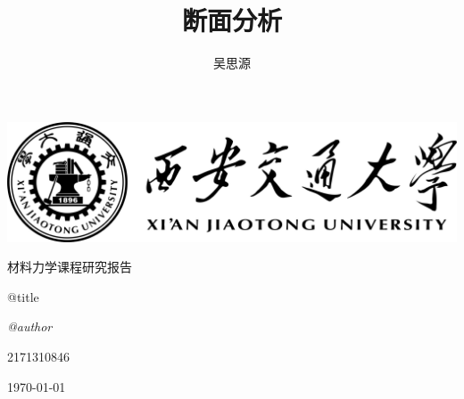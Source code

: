 \documentclass[12pt, a4paper]{ctexart}
\title{断面分析}
\author{吴思源}
\begin{document}
\begin{titlepage}
	\centering
	\includegraphics[width=1.0\textwidth]{./templates/logo.png}\par
	\vspace{2cm}
	{\kaishu\LARGE 材料力学课程研究报告\par}
	\vspace{1.5cm}
	{\fontsize{36pt}{\baselineskip} \heiti @title \par}
	\vspace{2cm}
	{\fangsong\Large\itshape @author\par}
	\vfill
	{2171310846}\par

	\vfill
	{\large \today\par}
\end{titlepage}
\end{document}
